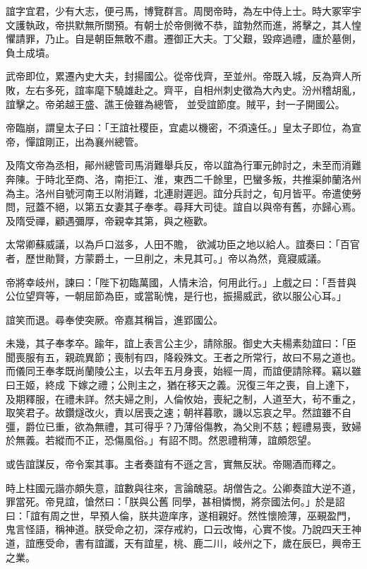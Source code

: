 \begin{pinyinscope}
 誼字宜君，少有大志，便弓馬，博覽群言。周閔帝時，為左中侍上士。時大冢宰宇文護執政，帝拱默無所關預。有朝士於帝側微不恭，誼勃然而進，將擊之，其人惶懼請罪，乃止。自是朝臣無敢不肅。遷御正大夫。丁父艱，毀瘁過禮，廬於墓側，負土成墳。



 武帝即位，累遷內史大夫，封揚國公。從帝伐齊，至並州。帝既入城，反為齊人所敗，左右多死，誼率麾下驍雄赴之。齊平，自相州刺史徵為大內史。汾州稽胡亂，誼擊之。帝弟越王盛、譙王儉雖為總管，
 並受誼節度。賊平，封一子開國公。



 帝臨崩，謂皇太子曰：「王誼社稷臣，宜處以機密，不須遠任。」皇太子即位，為宣帝，憚誼剛正，出為襄州總管。



 及隋文帝為丞相，鄖州總管司馬消難舉兵反，帝以誼為行軍元帥討之，未至而消難奔陳。于時北至商、洛，南拒江、淮，東西二千餘里，巴蠻多叛，共推渠帥蘭洛州為主。洛州自號河南王以附消難，北連尉遲迥。誼分兵討之，旬月皆平。帝遣使勞問，冠蓋不絕，以第五女妻其子奉孝。尋拜大司徒。誼自以與帝有舊，亦歸心焉。及隋受禪，顧遇彌厚，帝親幸其第，與之極歡。



 太常卿蘇威議，以為戶口滋多，人田不贍，
 欲減功臣之地以給人。誼奏曰：「百官者，歷世勛賢，方蒙爵土，一旦削之，未見其可。」帝以為然，竟寢威議。



 帝將幸岐州，諫曰：「陛下初臨萬國，人情未洽，何用此行。」上戲之曰：「吾昔與公位望齊等，一朝屈節為臣，或當恥愧，是行也，振揚威武，欲以服公心耳。」



 誼笑而退。尋奉使突厥。帝嘉其稱旨，進郢國公。



 未幾，其子奉孝卒。踰年，誼上表言公主少，請除服。御史大夫楊素劾誼曰：「臣聞喪服有五，親疏異節；喪制有四，降殺殊文。王者之所常行，故曰不易之道也。而儀同王奉孝既尚蘭陵公主，以去年五月身喪，始經一周，而誼便請除釋。竊以雖曰王姬，終成
 下嫁之禮；公則主之，猶在移天之義。況復三年之喪，自上達下，及期釋服，在禮未詳。然夫婦之則，人倫攸始，喪紀之制，人道至大，茍不重之，取笑君子。故鑽燧改火，責以居喪之速；朝祥暮歌，譏以忘哀之早。然誼雖不自彊，爵位已重，欲為無禮，其可得乎？乃薄俗傷教，為父則不慈；輕禮易喪，致婦於無義。若縱而不正，恐傷風俗。」有詔不問。然恩禮稍薄，誼頗怨望。



 或告誼謀反，帝令案其事。主者奏誼有不遜之言，實無反狀。帝賜酒而釋之。



 時上柱國元諧亦頗失意，誼數與往來，言論醜惡。胡僧告之。公卿奏誼大逆不道，罪當死。帝見誼，愴然曰：「朕與公舊
 同學，甚相憐憫，將奈國法何。」於是詔曰：「誼有周之世，早預人倫，朕共遊庠序，遂相親好。然性懷險薄，巫覡盈門，鬼言怪語，稱神道。朕受命之初，深存戒約，口云改悔，心實不悛。乃說四天王神道，誼應受命，書有誼讖，天有誼星，桃、鹿二川，岐州之下，歲在辰巳，興帝王之業。




\end{pinyinscope}
